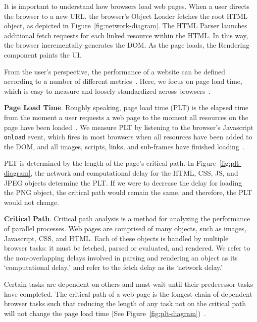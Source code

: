 It is important to understand how browsers load web pages. When a user directs the browser to a new URL, the browser's Object Loader fetches the root HTML object, as depicted
in Figure~\ref{fig:network-diagram}. The HTML Parser launches additional
fetch requests for each linked resource within the HTML. In this way, the browser incrementally generates the DOM.
As the page loads, the Rendering component paints the UI.

From the user's perspective, the performance of a website can be defined according to a number of different metrics~\cite{above-the-fold,speed-index}. Here,
we focus on page load time, which is easy to measure
and loosely standardized across browsers~\cite{w3c-onload}.

\textbf{Page Load Time}. Roughly speaking, page load time (PLT) is the elapsed time from the moment a user requests a web page to the moment all resources on the page have been loaded~\cite{page-speed}.
We measure PLT by listening to the browser's Javascript \texttt{onload} event,
which fires in most browsers when all resources have been added to the DOM, and all images,
scripts, links, and sub-frames have finished loading~\cite{w3c-onload}.

PLT is determined by the length of the page's critical path. In
Figure~\ref{fig:plt-diagram}, the network and computational delay for the HTML, CSS, JS, and JPEG
objects determine the PLT. If we were to decrease the delay for loading the
PNG object, the critical path would remain the same, and therefore, the PLT would not change.



\textbf{Critical Path}. Critical path analysis is a method for analyzing the performance of parallel processes. Web pages are comprised of many objects, such as images, Javascript, CSS, and HTML.
Each of these objects is handled by multiple browser tasks: it must be
fetched, parsed or evaluated, and rendered. We refer to the non-overlapping
delays involved in parsing and rendering an object as its `computational
delay,' and refer to the fetch delay as its `network delay.'

Certain tasks are dependent on others and must wait until their
predecessor tasks have completed. The critical path of a web page is the longest chain of dependent browser tasks such that reducing the length of any task not on the critical
path will not change the page load time (See Figure~\ref{fig:plt-diagram})~\cite{sarkar1987partitioning}.


